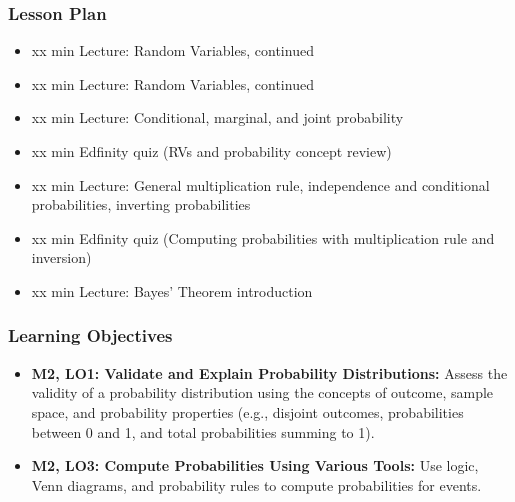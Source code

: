\begin{frame}
    \frametitle{Lesson Plan}
    \begin{itemize}
        \item xx min Lecture: Random Variables, continued
        \item xx min Lecture: Random Variables, continued
        \item xx min Lecture: Conditional, marginal, and joint probability
        \item xx min Edfinity quiz (RVs and probability concept review)
        \item xx min Lecture: General multiplication rule, independence and conditional probabilities, inverting probabilities
        \item xx min Edfinity quiz (Computing probabilities with multiplication rule and inversion)
        \item xx min Lecture: Bayes' Theorem introduction
    \end{itemize}
\end{frame}

\begin{frame}
    \frametitle{Learning Objectives}
    \begin{itemize}
        \item \textbf{M2, LO1: Validate and Explain Probability Distributions:} Assess the validity of a probability distribution using the concepts of outcome, sample space, and probability properties (e.g., disjoint outcomes, probabilities between 0 and 1, and total probabilities summing to 1).
        \item \textbf{M2, LO3: Compute Probabilities Using Various Tools:} Use logic, Venn diagrams, and probability rules to compute probabilities for events.
    \end{itemize}
\end{frame}


